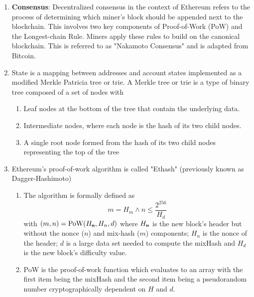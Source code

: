 \begin{enumerate}
\item\textbf{Consensus}: Decentralized consensus in the context of Ethereum refers to the process of determining which miner's block should be appended next to the blockchain. This involves two key components of Proof-of-Work (PoW) and the Longest-chain Rule. Miners apply these rules to build on the canonical blockchain. This is referred to as "Nakamoto Consensus" and is adapted from Bitcoin.

\item State is a mapping between addresses and account states implemented as a modified Merkle Patricia tree or trie. A Merkle tree or trie is a type of binary tree composed of a set of nodes with
\begin{enumerate}
\item Leaf nodes at the bottom of the tree that contain the underlying data.
\item Intermediate nodes, where each node is the hash of its two child nodes.
\item A single root node formed from the hash of its two child nodes representing the top of the tree
\end{enumerate}

\item Ethereum's proof-of-work algorithm is called "Ethash" (previously known as Dagger-Hashimoto)
\begin{enumerate}
\item The algorithm is formally defined as
$$
m = H_m \wedge n \leq\frac{2^{256}}{H_d}
$$
with $(m, n)=\text{PoW}(H_\text{\sout{n}},H_n,d)$ where $H_\text{\sout{n}}$ is the new block's header but without the nonce ($n$) and mix-hash ($m$) components; $H_n$ is the nonce of the header; $d$ is a large data set needed to compute the mixHash and $H_d$ is the new block's difficulty value.
\item PoW is the proof-of-work function which evaluates to an array with the first item being the mixHash and the second item being a pseudorandom number cryptographically dependent on $H$ and $d$.
\end{enumerate}


\end{enumerate}
